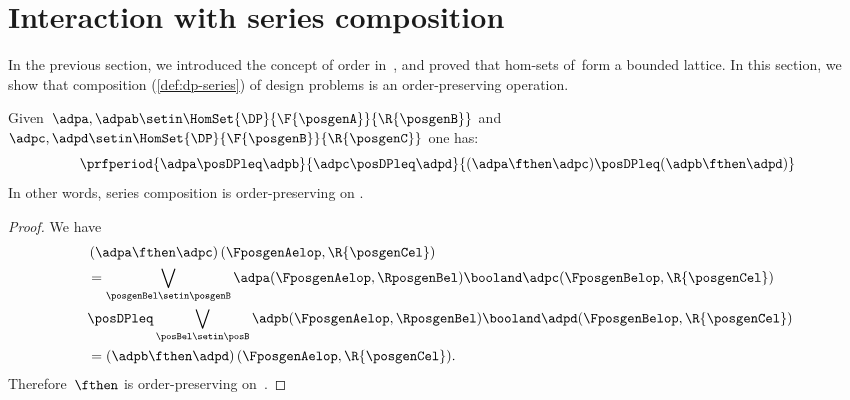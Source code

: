 
\section{Interaction with series composition}
In the previous section, we introduced the concept of order in~\DP, and proved that hom-sets of~\DP form a bounded lattice.
In this section, we show that composition (\cref{def:dp-series}) of design problems is an order-preserving operation.

\begin{lemma}
    \label{lem:series_pres_order}
    Given~$\adpa,\adpab \setin \HomSet{\DP}{\F{\posgenA}}{\R{\posgenB}}$ and~$\adpc,\adpd \setin \HomSet{\DP}{\F{\posgenB}}{\R{\posgenC}}$ one has:
    \begin{equation}
        \prfperiod{
            \adpa\posDPleq \adpb
        }{
            \adpc\posDPleq \adpd
        }{
            (\adpa\fthen \adpc) \posDPleq (\adpb\fthen \adpd)
        }
    \end{equation}
    In other words, series composition is order-preserving on \DP.
\end{lemma}

\begin{proof}
    We have
    \begin{equation}
        \label{eq:series_pres_ord}
        \begin{aligned}
            ~ & \left( \adpa\fthen \adpc\right)(\FposgenAelop,\R{\posgenCel}) \\
              & = \bigvee_{\posgenBel\setin \posgenB}\adpa(\FposgenAelop,\RposgenBel)\booland \adpc(\FposgenBelop,\R{\posgenCel}) \\
              & \posDPleq \bigvee_{\posBel\setin \posB} \adpb(\FposgenAelop,\RposgenBel)\booland \adpd(\FposgenBelop,\R{\posgenCel}) \\
              & =\left( \adpb\fthen \adpd\right)(\FposgenAelop,\R{\posgenCel}).
        \end{aligned}
    \end{equation}
    Therefore~$\fthen$ is order-preserving on~\DP.
\end{proof}

